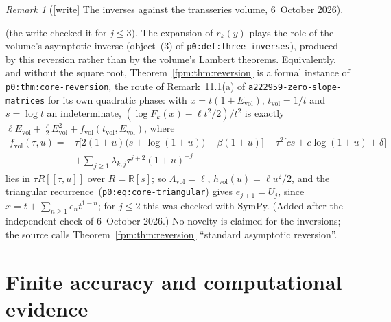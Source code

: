 \documentclass[11pt]{article}
\theoremstyle{definition}\newtheorem{definition}[theorem]{Definition}
\theoremstyle{remark}\newtheorem{remark}[theorem]{Remark}
\newcommand{\file}[1]{\nolinkurl{#1}}
\begin{document}
\begin{remark}[{[write]} The inverses against the transseries volume, 6~October 2026]
\begin{enumerate}[label=(\alph*)]
 (the write checked it for $j\le3$). The expansion of $r_k(y)$ plays the
 role of the volume's asymptotic inverse (object~(3) of
 \file{p0:def:three-inverses}), produced by this reversion rather than by
 the volume's Lambert theorems. Equivalently, and without the square root,
 Theorem~\ref{fpm:thm:reversion} is a formal instance of
 \file{p0:thm:core-reversion}, the route of Remark~11.1(a) of
 \file{a222959-zero-slope-matrices} for its own quadratic phase: with
 $x=t(1+E_{\mathrm{vol}})$, $t_{\mathrm{vol}}=1/t$ and $s=\log t$ an
 indeterminate, $(\log F_k(x)-\ell t^2/2)/t^2$ is exactly
 $\ell E_{\mathrm{vol}}+\frac\ell2E_{\mathrm{vol}}^2
 +f_{\mathrm{vol}}(t_{\mathrm{vol}},E_{\mathrm{vol}})$, where
 \begin{align*}
  f_{\mathrm{vol}}(\tau,u)={}&\tau\bigl[2(1+u)\bigl(s+\log(1+u)\bigr)-\beta(1+u)\bigr]
  +\tau^2\bigl[cs+c\log(1+u)+\delta\bigr]\\
  &+\sum_{j\ge1}\lambda_{k,j}\tau^{j+2}(1+u)^{-j}
 \end{align*}
 lies in $\tau R[[\tau,u]]$ over $R=\mathbb R[s]$; so
 $\Lambda_{\mathrm{vol}}=\ell$, $h_{\mathrm{vol}}(u)=\ell u^2/2$, and the
 triangular recurrence~(\file{p0:eq:core-triangular}) gives
 $e_{j+1}=U_j$, since $x=t+\sum_{n\ge1}e_nt^{1-n}$; for $j\le2$ this was
 checked with SymPy. \textup{(Added after the independent check of
 6~October 2026.)} No novelty is claimed for the inversions; the
 source calls Theorem~\ref{fpm:thm:reversion} ``standard asymptotic
 reversion''.
\end{enumerate}
\end{remark}

\section{Finite accuracy and computational evidence}\label{fpm:sec:computation}
\end{document}
